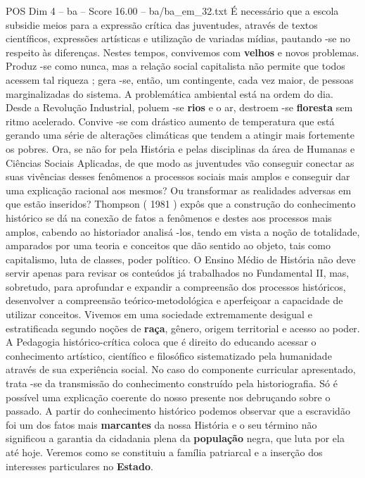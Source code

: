 \begin{textsample}{POS Dim 4 – ba – Score 16.00 – ba/ba\_em\_32.txt}
É necessário que a escola subsidie meios para a expressão crítica das juventudes, através de textos científicos, expressões artísticas e utilização de variadas mídias, pautando -se no respeito às diferenças.
Nestes tempos, convivemos com \textbf{velhos} e novos problemas.
Produz -se como nunca, mas a relação social capitalista não permite que todos acessem tal riqueza ; gera -se, então, um contingente, cada vez maior, de pessoas marginalizadas do sistema.
A problemática ambiental está na ordem do dia.
Desde a Revolução Industrial, poluem -se \textbf{rios} e o ar, destroem -se \textbf{floresta} sem ritmo acelerado.
Convive -se com drástico aumento de temperatura que está gerando uma série de alterações climáticas que tendem a atingir mais fortemente os pobres.
Ora, se não for pela História e pelas disciplinas da área de Humanas e Ciências Sociais Aplicadas, de que modo as juventudes vão conseguir conectar as suas vivências desses fenômenos a processos sociais mais amplos e conseguir dar uma explicação racional aos mesmos?
Ou transformar as realidades adversas em que estão inseridos?
Thompson ( 1981 ) expôs que a construção do conhecimento histórico se dá na conexão de fatos a fenômenos e destes aos processos mais amplos, cabendo ao historiador analisá -los, tendo em vista a noção de totalidade, amparados por uma teoria e conceitos que dão sentido ao objeto, tais como capitalismo, luta de classes, poder político.
O Ensino Médio de História não deve servir apenas para revisar os conteúdos já trabalhados no Fundamental II, mas, sobretudo, para aprofundar e expandir a compreensão dos processos históricos, desenvolver a compreensão teórico-metodológica e aperfeiçoar a capacidade de utilizar conceitos.
Vivemos em uma sociedade extremamente desigual e estratificada segundo noções de \textbf{raça}, gênero, origem territorial e acesso ao poder.
A Pedagogia histórico-crítica coloca que é direito do educando acessar o conhecimento artístico, científico e filosófico sistematizado pela humanidade através de sua experiência social.
No caso do componente curricular apresentado, trata -se da transmissão do conhecimento construído pela historiografia.
Só é possível uma explicação coerente do nosso presente nos debruçando sobre o passado.
A partir do conhecimento histórico podemos observar que a escravidão foi um dos fatos mais \textbf{marcantes} da nossa História e o seu término não significou a garantia da cidadania plena da \textbf{população} negra, que luta por ela até hoje.
Veremos como se constituiu a família patriarcal e a inserção dos interesses particulares no \textbf{Estado}.

\end{textsample}
